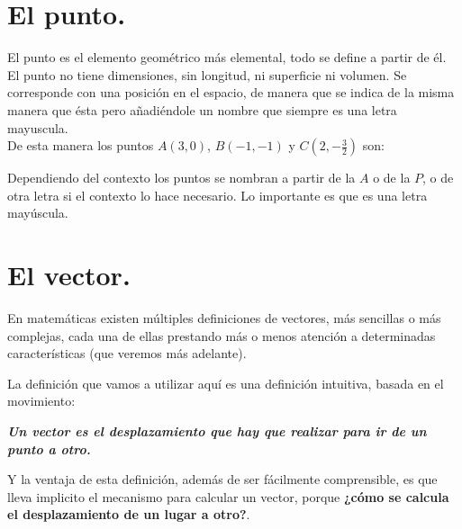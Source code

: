 \documentclass[a4paper,11pt,answers]{exam}
\begin{document}
\section{El punto.}
El punto es el elemento geométrico más elemental, todo se define a partir de él.\\
El punto no tiene dimensiones, sin longitud, ni superficie ni volumen. Se corresponde con una
posición en el espacio, de manera que se indica de la misma manera que ésta pero añadiéndole un
nombre que siempre es una letra mayuscula.\\

De esta manera los puntos $A(3, 0)$, $B(-1, -1)$ y $C\left(2, -\frac{3}{2}\right)$ son:
\begin{center}
\end{center}

Dependiendo del contexto los puntos se nombran a partir de la $A$ o de la $P$, o de otra letra
si el contexto lo hace necesario. Lo importante es que es una letra mayúscula.
\section{El vector.}
En matemáticas existen múltiples definiciones de vectores, más sencillas o más complejas,
cada una de ellas prestando más o menos atención a determinadas características (que veremos más
adelante).

La definición que vamos a utilizar aquí es una definición intuitiva, basada en el movimiento:
\begin{center}
  \emph{\textbf{Un vector es el desplazamiento que hay que realizar para ir de un punto a otro.}}  
\end{center}
Y la ventaja de esta definición, además de ser fácilmente comprensible, es que lleva implicito
el mecanismo para calcular un vector, porque \textbf{¿cómo se calcula el desplazamiento de un lugar a otro?}.
\end{document}
